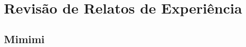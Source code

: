 \chapter{Revisão de Relatos de Experiência}
	\section{Mimimi}
		\cite{Piegas2012}
		\cite{Parzinello2012}
		\cite{Valerio2013}
		\cite{Stefano2013}
		\cite{Rodrigues2013}
		\cite{Vieira2013}
		\cite{Queiroz2013}
		\cite{Bastos2013}
		\cite{Maciel2013}
		\cite{Ahmed2008}
		\cite{Karaj2013}
		\cite{Hui2013}
		\cite{Sahota2012}
		\cite{Srinath2012}